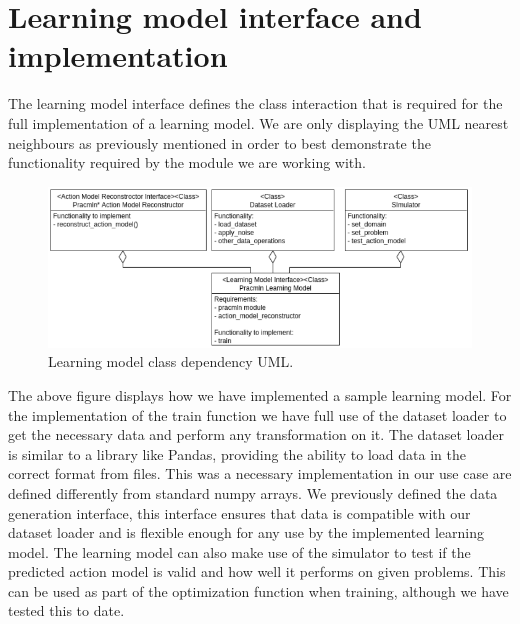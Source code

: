 \newpage

\section{Learning model interface and implementation}
The learning model interface defines the class interaction that is required for the full implementation of a learning model.
We are only displaying the UML nearest neighbours as previously mentioned in order to best demonstrate the functionality required by the module we are working with.
\begin{figure}[h]
 \centering
 \includegraphics[width=1\textwidth]{images/architecture/learning_module_interaction_uml}
 \caption{Learning model class dependency UML.}
  \label{fig:learning-module-interaction-uml}
\end{figure}
\newline
The above figure displays how we have implemented a sample learning model.
For the implementation of the train function we have full use of the dataset loader to get the necessary data and perform any transformation on it.
The dataset loader is similar to a library like Pandas, providing the ability to load data in the correct format from files.
This was a necessary implementation in our use case are defined differently from standard numpy arrays.
We previously defined the data generation interface, this interface ensures that data is compatible with our dataset loader and is flexible enough for any use by the implemented learning model.
The learning model can also make use of the simulator to test if the predicted action model is valid and how well it performs on given problems.
This can be used as part of the optimization function when training, although we have tested this to date.

